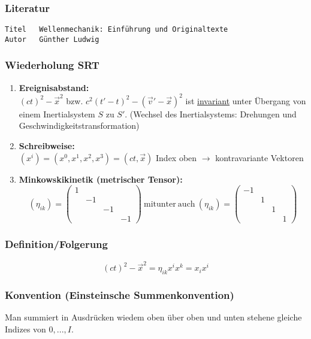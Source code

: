 \documentclass[twoside,a4paper]{scrartcl}
\renewcommand{\1}{\mathds{1}}
\newcommand{\ra}{\rightarrow}
\begin{document}
\subsubsection*{Literatur}
\begin{tiny}
\begin{verbatim}
Titel	Wellenmechanik: Einführung und Originaltexte
Autor	Günther Ludwig
\end{verbatim}
\end{tiny}


\subsubsection{Wiederholung SRT}
\begin{enumerate}
\item \textbf{Ereignisabstand:}\\
$(ct)^2-\vec x^2$ bzw. $c^2(t'-t)^2-(\vec v'-\vec x)^2$ ist \underline{invariant} unter Übergang von einem Inertialsystem $S$ zu $S'$. (Wechsel des Inertialsystems: Drehungen und Geschwindigkeitstransformation)
\item \textbf{Schreibweise:}\\
$(x^i)=(x^0,x^1,x^2,x^3)=(ct,\vec x)$ Index oben $\ra$ kontravariante Vektoren
\item \textbf{Minkowskikinetik (metrischer Tensor):}\\
$$(\eta_{ik})=\begin{pmatrix}1 \\ & -1 \\ & & -1 \\ & & & -1\end{pmatrix} \ \mathrm{mitunter \ auch \ } (\eta_{ik})=\begin{pmatrix}-1 \\ & 1 \\ & & 1 \\ & & & 1\end{pmatrix}$$
\end{enumerate}
\subsubsection*{Definition/Folgerung}
$$(ct)^2-\vec x^2= \eta_{ik} x^ix^k=x_ix^i$$
\subsubsection*{Konvention (Einsteinsche Summenkonvention)}
Man summiert in Ausdrücken wiedem oben über oben und unten stehene gleiche Indizes von $0,...,I$.
\end{document}
